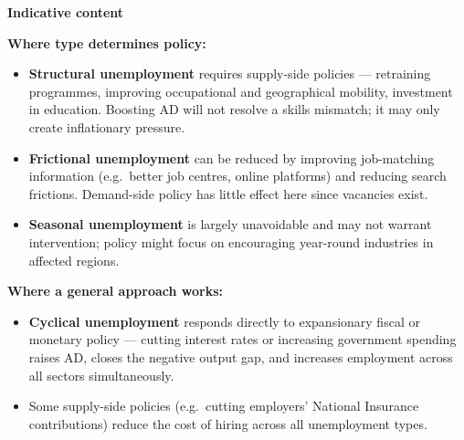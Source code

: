 \documentclass[12pt,a4paper]{article}
\begin{document}
\vspace{0.8em}

\textbf{Indicative content}

\vspace{0.3em}
\textbf{Where type determines policy:}
\begin{itemize}
    \item \textbf{Structural unemployment} requires supply-side policies --- retraining programmes, improving occupational and geographical mobility, investment in education. Boosting AD will not resolve a skills mismatch; it may only create inflationary pressure.
    \item \textbf{Frictional unemployment} can be reduced by improving job-matching information (e.g.\ better job centres, online platforms) and reducing search frictions. Demand-side policy has little effect here since vacancies exist.
    \item \textbf{Seasonal unemployment} is largely unavoidable and may not warrant intervention; policy might focus on encouraging year-round industries in affected regions.
\end{itemize}

\vspace{0.3em}
\textbf{Where a general approach works:}
\begin{itemize}
    \item \textbf{Cyclical unemployment} responds directly to expansionary fiscal or monetary policy --- cutting interest rates or increasing government spending raises AD, closes the negative output gap, and increases employment across all sectors simultaneously.
    \item Some supply-side policies (e.g.\ cutting employers' National Insurance contributions) reduce the cost of hiring across all unemployment types.
\end{itemize}
\end{document}
